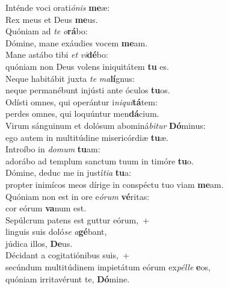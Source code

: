 \evenverse Inténde voci orati\textit{ó}\textit{nis} \textbf{me}æ:~\*\\
\evenverse Rex meus et Deus \textbf{me}us.\\
\oddverse Quóniam ad \textit{te} \textit{o}\textbf{rá}bo:~\*\\
\oddverse Dómine, mane exáudies vocem \textbf{me}am.\\
\evenverse Mane astábo tibi \textit{et} \textit{vi}\textbf{dé}bo:~\*\\
\evenverse quóniam non Deus volens iniquitátem \textbf{tu} es.\\
\oddverse Neque habitábit juxta \textit{te} \textit{ma}\textbf{lí}gnus:~\*\\
\oddverse neque permanébunt injústi ante óculos \textbf{tu}os.\\
\evenverse Odísti omnes, qui operántur i\textit{ni}\textit{qui}\textbf{tá}tem:~\*\\
\evenverse perdes omnes, qui loquúntur men\textbf{dá}cium.\\
\oddverse Virum sánguinum et dolósum abominá\textit{bi}\textit{tur} \textbf{Dó}minus:~\*\\
\oddverse ego autem in multitúdine misericórdiæ \textbf{tu}æ.\\
\evenverse Introíbo in \textit{do}\textit{mum} \textbf{tu}am:~\*\\
\evenverse adorábo ad templum sanctum tuum in timóre \textbf{tu}o.\\
\oddverse Dómine, deduc me in justí\textit{ti}\textit{a} \textbf{tu}a:~\*\\
\oddverse propter inimícos meos dírige in conspéctu tuo viam \textbf{me}am.\\
\evenverse Quóniam non est in ore e\textit{ó}\textit{rum} \textbf{vé}ritas:~\*\\
\evenverse cor eórum \textbf{va}num est.\\
\oddverse Sepúlcrum patens est guttur eórum,~+\\
\oddverse  linguis suis doló\textit{se} \textit{a}\textbf{gé}bant,~\*\\
\oddverse júdica illos, \textbf{De}us.\\
\evenverse Décidant a cogitatiónibus suis,~+\\
\evenverse  secúndum multitúdinem impietátum eórum ex\textit{pél}\textit{le} \textbf{e}os,~\*\\
\evenverse quóniam irritavérunt te, \textbf{Dó}mine.\\
